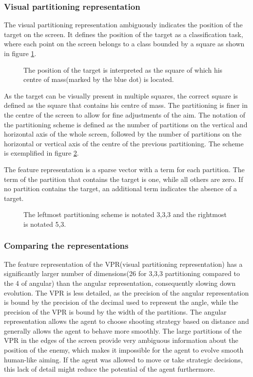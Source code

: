 \subsubsection{Visual partitioning representation}
The visual partitioning representation ambiguously indicates the position of the target on the screen. It defines the position of the target as a classification task, where each point on the screen belongs to a class bounded by a square as shown in figure \ref{fig:visualpartitioning}. 
\begin{figure}[H]
    \centering
    	
    \caption{The position of the target is interpreted as the square of which his centre of mass(marked by the blue dot) is located.}
    \label{fig:visualpartitioning}
\end{figure}
\noindent
As the target can be visually present in multiple squares, the correct square is defined as the square that contains his centre of mass. The partitioning is finer in the centre of the screen to allow for fine adjustments of the aim. The notation of the partitioning scheme is defined as the number of partitions on the vertical and horizontal axis of the whole screen, followed by the number of partitions on the horizontal or vertical axis of the centre of the previous partitioning. The scheme is exemplified in figure \ref{fig:visualpartitioningcompared}.

The feature representation is a sparse vector with a term for each partition. The term of the partition that contains the target is one, while all others are zero. If no partition contains the target, an additional term indicates the absence of a target.
\begin{figure}[H]
    \centering
    	
    \caption{The leftmost partitioning scheme is notated 3,3,3 and the rightmost is notated 5,3.}
    \label{fig:visualpartitioningcompared}
\end{figure}
\noindent

\subsubsection{Comparing the representations}
The feature representation of the VPR(visual partitioning representation) has a significantly larger number of dimensions(26 for 3,3,3 partitioning compared to the 4 of angular) than the angular representation, consequently slowing down evolution. The VPR is less detailed, as the precision of the angular representation is bound by the precision of the decimal used to represent the angle, while the precision of the VPR is bound by the width of the partitions. The angular representation allows the agent to choose shooting strategy based on distance and generally allows the agent to behave more smoothly. The large partitions of the VPR in the edges of the screen provide very ambiguous information about the position of the enemy, which makes it impossible for the agent to evolve smooth human-like aiming. If the agent was allowed to move or take strategic decisions, this lack of detail might reduce the potential of the agent furthermore.

